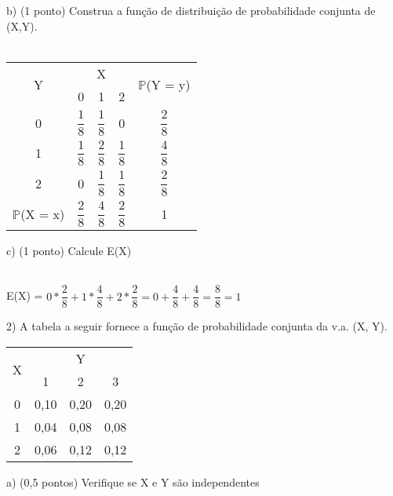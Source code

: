 \documentclass[12pt,a4paper]{article}
\begin{document}
	\vspace{1cm}
	b) (1 ponto) Construa a função de distribuição de probabilidade conjunta de (X,Y).\\
	\vspace{0.5cm}\\
	\begin{center}
		\begin{tabular}{ccccc}\midrule
			\multirow{2}{*}{Y} & \multicolumn{3}{c}{X} & \multirow{2}{*}{$\mathbb{P}$(Y = y)}\\ \cmidrule{2-4}
			& 0 & 1 & 2 & \\ \midrule
			0 & $\dfrac{1}{8}$ & $\dfrac{1}{8}$ & 0 & $\dfrac{2}{8}$\\ \midrule
			1 & $\dfrac{1}{8}$ & $\dfrac{2}{8}$ & $\dfrac{1}{8}$ & $\dfrac{4}{8}$\\ \midrule
			2 & 0 & $\dfrac{1}{8}$ & $\dfrac{1}{8}$ & $\dfrac{2}{8}$\\ \midrule
			$\mathbb{P}$(X = x) & $\dfrac{2}{8}$ & $\dfrac{4}{8}$ & $\dfrac{2}{8}$ & 1\\ \midrule
		\end{tabular}
	\end{center}
	\vspace{1cm}
	c) (1 ponto) Calcule E(X)\\
	\vspace{0.25cm}\\
	\begin{center}
		E(X) = $0 * \dfrac{2}{8} + 1 * \dfrac{4}{8} + 2 * \dfrac{2}{8} = 0 + \dfrac{4}{8} + \dfrac{4}{8} = \dfrac{8}{8} =1 $
	\end{center} 
	\vspace{1cm}
	2) A tabela a seguir fornece a função de probabilidade conjunta da v.a. (X, Y).
	\vspace{0.25cm}\\
	\begin{center}
		\begin{tabular}{|c|c|c|c|}\hline
			\multirow{2}{*}{X} & \multicolumn{3}{c|}{Y}\\ \cline{2-4}
			& 1 & 2 & 3\\ \hline
			0 & 0,10 & 0,20 & 0,20\\ \hline
			1 & 0,04 & 0,08 & 0,08\\ \hline
			2 & 0,06 & 0,12 & 0,12\\ \hline
		\end{tabular}
	\end{center}
	\vspace{0.25cm}
	a) (0,5 pontos) Verifique se X e Y são independentes\\
\end{document}
